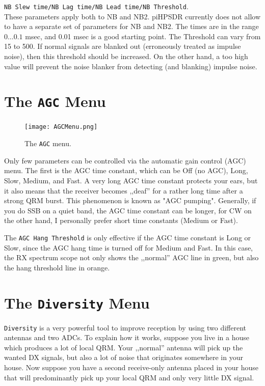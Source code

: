 \documentclass[12pt]{book}
\def\rett#1{\texttt{\color{red}#1}}
\def\bltt#1{\texttt{\color{blue}#1}}
\def\pH{pi\-HPSDR\xspace}
\begin{document}
\rett{NB Slew time/NB Lag time/NB Lead time/NB Threshold}.\\
These parameters apply both to NB and NB2.
\pH currently does not allow to have a separate set of parameters for NB and NB2.
The times are in the range $0\ldots0.1$ msec, and 0.01 msec is a good starting point. The Threshold
can vary from 15 to 500. If normal signals are blanked out (erroneously treated as impulse noise),
then this threshold should be increased. On the other hand, a too high value will prevent the
noise blanker from detecting (and blanking) impulse noise.


\section{The \texttt{AGC} Menu}

\begin{figure}[ht]
\center
\texttt{[image: AGCMenu.png]}
\caption{The \bltt{AGC} menu.}
\label{fig:AGCMenu}
\end{figure}

Only few parameters can be controlled via the automatic gain control (AGC) menu.
The first is the AGC time constant, which can be Off (no AGC), Long, Slow, Medium,
and Fast. A very long AGC time constant protects your ears, but it also means that
the receiver becomes ,,deaf'' for a rather long time after a strong QRM burst. This
phenomenon is known as "AGC pumping". Generally, if you do SSB on a quiet band, the
AGC time constant can be longer, for CW on the other hand, I personally prefer short
time constants (Medium or Fast).

The \rett{AGC Hang Threshold} is only effective if the AGC time constant is Long or Slow,
since the AGC hang time is turned off for Medium and Fast.
In this case, the RX spectrum scope not only shows the ,,normal'' AGC line in green,
but also the hang threshold line in orange.


\section{The \texttt{Diversity} Menu}

\bltt{Diversity} is a very powerful tool to improve reception by using two different
antennas and two ADCs. To explain how it works, suppose you live in a house which produces
a lot of local QRM. Your ,,normal'' antenna will pick up the wanted DX signals, but also
a lot of noise that originates somewhere in your house. Now suppose you have a second
receive-only antenna placed in your house that will predominantly pick up your local
QRM and only very little DX signal.
\end{document}
